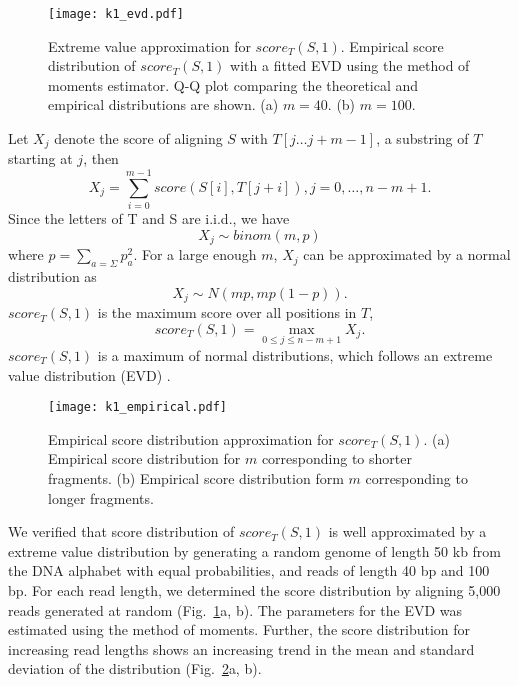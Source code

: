 \begin{figure}[t!]
\centering
\texttt{[image: k1\_evd.pdf]}
\caption[Extreme value distribution approximation for $score_T(S,1)$]{
  Extreme value approximation for $score_T(S,1)$.
  Empirical score distribution of $score_T(S,1)$ with a fitted
  EVD using the method of moments estimator.
  Q-Q plot comparing the theoretical and empirical distributions are shown.
  (a) $m=40$.
  (b) $m=100$.}
\label{evd_approx}
\end{figure}

Let $X_j$ denote the score of aligning $S$ with $T[j \dots j+m-1]$, a
substring of $T$ starting at $j$, then \[X_j = \sum_{i=0}^{m-1}
score(S[i],T[j+i]), j = 0, \dots, n-m+1.\] Since the letters of T and S
are i.i.d., we have \[X_j \sim binom(m,p)\] where $p = \sum_{a=\Sigma}
p_a^2$.  For a large enough $m$, $X_j$ can be approximated by a normal
distribution as \[X_j \sim N(mp, mp(1-p)).  \] $score_T(S,1)$ is the
maximum score over all positions in $T$, \[score_T(S,1) = \max_{0 \leq j
\leq n-m+1} X_j.\] $score_T(S,1)$ is a maximum of normal distributions,
which follows an extreme value distribution (EVD)
\citep{kotz2000extreme}.

\begin{figure}[t!]
\centering
\texttt{[image: k1\_empirical.pdf]}
\caption[Empirical score distribution for $score_T(S,1)$]{
  Empirical score distribution approximation for $score_T(S,1)$.
  (a) Empirical score distribution for $m$ corresponding to shorter
  fragments.
  (b) Empirical score distribution form $m$ corresponding to longer
  fragments.}
\label{evd_empirical}
\end{figure}

We verified that score distribution of $score_T(S,1)$ is well
approximated by a extreme value distribution by generating a random
genome of length 50 kb from the DNA alphabet with equal probabilities,
and reads of length 40 bp and 100 bp. For each read length, we
determined the score distribution by aligning 5,000 reads generated at
random (Fig.~\ref{evd_approx}a, b). The parameters for the EVD was
estimated using the method of moments.
Further, the score distribution for increasing read lengths shows an
increasing trend in the mean and standard deviation of the distribution
(Fig.~\ref{evd_empirical}a, b).


